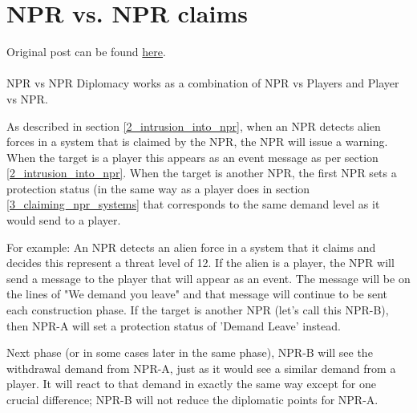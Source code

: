 \documentclass[../../Aurora C# unofficial manual.tex]{subfiles}
\begin{document}
	\section{NPR vs. NPR claims}\label{4_npr_vs_npr_claims}
	Original post can be found
	\href{http://aurora2.pentarch.org/index.php?topic=8495.msg118398#msg118398}{here}.
	\\\\
	
	NPR vs NPR Diplomacy works as a combination of NPR vs Players and Player vs NPR.
	
	As described in section \ref{2_intrusion_into_npr}, when an NPR detects alien forces in a system that is claimed by the NPR, the NPR will issue a warning. When the target is a player this appears as an event message as per section \ref{2_intrusion_into_npr}. When the target is another NPR, the first NPR sets a protection status (in the same way as a player does in section \ref{3_claiming_npr_systems} that corresponds to the same demand level as it would send to a player.
	
	For example: An NPR detects an alien force in a system that it claims and decides this represent a threat level of 12. If the alien is a player, the NPR will send a message to the player that will appear as an event. The message will be on the lines of "We demand you leave" and that message will continue to be sent each construction phase. If the target is another NPR (let's call this NPR-B), then NPR-A will set a protection status of 'Demand Leave' instead.
	
	Next phase (or in some cases later in the same phase), NPR-B will see the withdrawal demand from NPR-A, just as it would see a similar demand from a player. It will react to that demand in exactly the same way except for one crucial difference; NPR-B will not reduce the diplomatic points for NPR-A.
	
\end{document}
